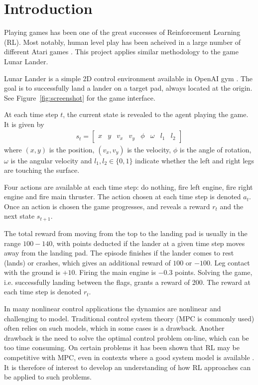 \documentclass{article}
\begin{document}
\section{Introduction}
\label{introduction}

Playing games has been one of the great successes of Reinforcement Learning (RL). Most notably, human level play has been acheived in a large number of different Atari games \cite{mnih2015humanlevel}. This project applies similar methodology to the game Lunar Lander.

Lunar Lander is a simple 2D control environment available in OpenAI gym \cite{gym}. The goal is to successfully land a lander on a target pad, always located at the origin. See Figure~\ref{fig:screenshot} for the game interface.

At each time step $t$, the current state is revealed to the agent playing the game. It is given by
\begin{align}
  s_t = \begin{bmatrix} x & y & v_x & v_y & \phi & \omega & l_1 & l_ 2 \end{bmatrix}
\end{align}
where $(x,y)$ is the position, $(v_x, v_y)$ is the velocity, $\phi$ is the angle of rotation, $\omega$ is the angular velocity and $l_1, l_2 \in \{ 0,1 \}$ indicate whether the left and right legs are touching the surface.

Four actions are available at each time step: do nothing, fire left engine, fire right engine and fire main thruster. The action chosen at each time step is denoted $a_t$. Once an action is chosen the game progresses, and reveals a reward $r_t$ and the next state $s_{t+1}$.

The total reward from moving from the top to the landing pad is usually in the range $100 - 140$, with points deducted if the lander at a given time step moves away from the landing pad. The episode finishes if the lander comes to rest (lands) or crashes, which gives an additional reward of $100$ or $-100$. Leg contact with the ground is $+10$. Firing the main engine is $-0.3$ points. Solving the game, i.e. successfully landing between the flags, grants a reward of 200. The reward at each time step is denoted $r_t$.

In many nonlinear control applications the dynamics are nonlinear and challenging to model. Traditional control system theory (MPC is commonly used) often relies on such models, which in some cases is a drawback. Another drawback is the need to solve the optimal control problem on-line, which can be too time consuming. On certain problems it has been shown that RL may be competitive with MPC, even in contexts where a good system model is available \cite{control}. It is therefore of interest to develop an understanding of how RL approaches can be applied to such problems.
\end{document}

